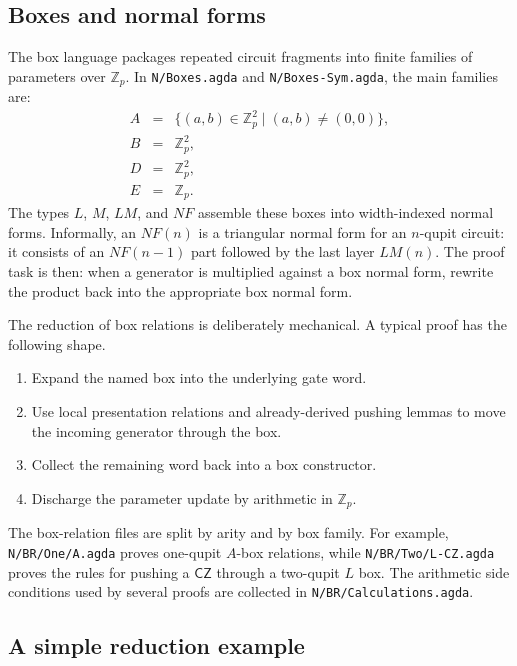 \documentclass[a4paper,11pt]{article}
\newcommand{\Zp}{\mathbb Z_p}
\newcommand{\czGate}{\mathsf {CZ}}
\newcommand{\code}[1]{\texttt{#1}}
\begin{document}
\subsection{Boxes and normal forms}

The box language packages repeated circuit fragments into finite
families of parameters over $\Zp$.  In \code{N/Boxes.agda} and
\code{N/Boxes-Sym.agda}, the main families are:
\[
\begin{array}{ccl}
A &=& \{(a,b)\in \Zp^2 \mid (a,b)\ne(0,0)\},\\
B &=& \Zp^2,\\
D &=& \Zp^2,\\
E &=& \Zp .
\end{array}
\]
The types $L$, $M$, $LM$, and $NF$ assemble these boxes into
width-indexed normal forms.  Informally, an $NF(n)$ is a triangular
normal form for an $n$-qupit circuit: it consists of an $NF(n-1)$
part followed by the last layer $LM(n)$.  The proof task is then:
when a generator is multiplied against a box normal form, rewrite the
product back into the appropriate box normal form.

The reduction of box relations is deliberately mechanical.  A typical
proof has the following shape.

\begin{enumerate}
\item Expand the named box into the underlying gate word.
\item Use local presentation relations and already-derived pushing
      lemmas to move the incoming generator through the box.
\item Collect the remaining word back into a box constructor.
\item Discharge the parameter update by arithmetic in $\Zp$.
\end{enumerate}

The box-relation files are split by arity and by box family.  For
example, \code{N/BR/One/A.agda} proves one-qupit $A$-box relations,
while \code{N/BR/Two/L-CZ.agda} proves the rules for pushing a
$\czGate$ through a two-qupit $L$ box.  The arithmetic side
conditions used by several proofs are collected in
\code{N/BR/Calculations.agda}.

\subsection{A simple reduction example}
\end{document}
